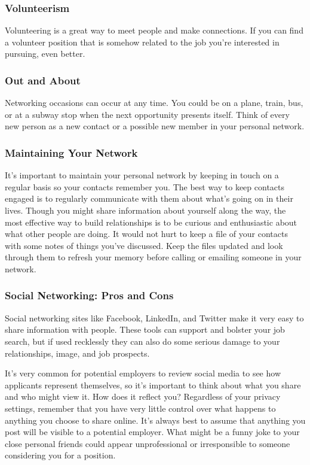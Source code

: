 \subsubsection*{Volunteerism}
Volunteering is a great way to meet people and make connections. If you can find a volunteer position that is somehow related to the job you're interested in pursuing, even better.
\subsubsection*{Out and About}
Networking occasions can occur at any time. You could be on a plane, train, bus, or at a subway stop when the next opportunity presents itself. Think of every new person as a new contact or a possible new member in your personal network.
\subsubsection*{Maintaining Your Network}
It's important to maintain your personal network by keeping in touch on a regular basis so your contacts remember you. The best way to keep contacts engaged is to regularly communicate with them about what's going on in their lives. Though you might share information about yourself along the way, the most effective way to build relationships is to be curious and enthusiastic about what other people are doing. It would not hurt to keep a file of your contacts with some notes of things you've discussed. Keep the files updated and look through them to refresh your memory before calling or emailing someone in your network.
\subsubsection*{Social Networking: Pros and Cons}
Social networking sites like Facebook, LinkedIn, and Twitter make it very easy to share information with people. These tools can support and bolster your job search, but if used recklessly they can also do some serious damage to your relationships, image, and job prospects.

It's very common for potential employers to review social media to see how applicants represent themselves, so it's important to think about what you share and who might view it. How does it reflect you? Regardless of your privacy settings, remember that you have very little control over what happens to anything you choose to share online. It's always best to assume that anything you post will be visible to a potential employer. What might be a funny joke to your close personal friends could appear unprofessional or irresponsible to someone considering you for a position.

